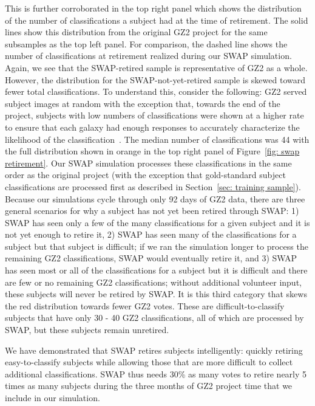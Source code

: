  This is further corroborated in the top right panel which shows the distribution of the number of classifications a subject had at the time of retirement. The solid lines show this distribution from the original GZ2 project for the same subsamples as the top left panel. For comparison, the dashed line shows the number of classifications at retirement realized during our SWAP simulation. Again, we see that the SWAP-retired sample is representative of GZ2 as a whole. However, the distribution for the SWAP-not-yet-retired sample is skewed toward fewer total classifications. To understand this, consider the following: GZ2 served subject images at random with the  exception that, towards the end of the project, subjects with low numbers of classifications were shown at a higher rate to ensure that each galaxy had enough responses to accurately characterize the likelihood of the classification~\citep{Willett2013}. The median number of classifications was 44 with the full distribution shown in orange in the top right panel of Figure~\ref{fig: swap retirement}. Our SWAP simulation processes these classifications in the same order as the original project (with the exception that gold-standard subject classifications are processed first as described in Section~\ref{sec: training sample}). Because our simulations cycle through only 92 days of GZ2 data, there are three general scenarios for why a subject has not yet been retired through SWAP: 1) SWAP has seen only a few of the many classifications for a given subject and it is not yet enough to retire it, 2) SWAP has seen many of the classifications for a subject but that subject is difficult; if we ran the simulation longer to process the remaining GZ2 classifications, SWAP would eventually retire it, and 3) SWAP has seen most or all of the classifications for a subject but it is difficult and there are few or no remaining GZ2 classifications; without additional volunteer input, these subjects will never be retired by SWAP. It is this third category that skews the red distribution towards fewer GZ2 votes. These are difficult-to-classify subjects that have only 30 - 40 GZ2 classifications, all of which are processed by SWAP, but these subjects remain unretired.

We have demonstrated that SWAP retires subjects intelligently: quickly retiring easy-to-classify subjects while allowing those that are more difficult to collect additional classifications. SWAP thus needs 30\% as many votes to retire nearly 5 times as many subjects during the three months of GZ2 project time that we include in our simulation.


